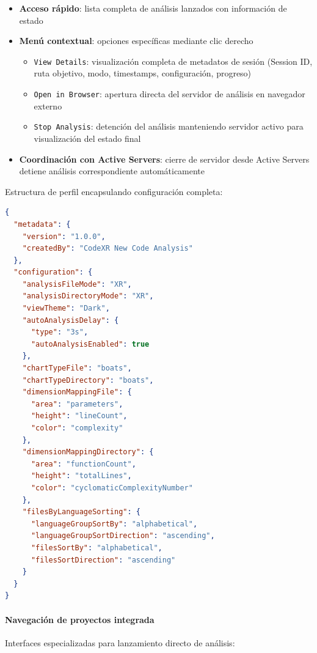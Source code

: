 \documentclass[a4paper, 12pt]{book}
\begin{document}
\begin{itemize}
  \item \textbf{Acceso rápido}: lista completa de análisis lanzados con información de estado
  \item \textbf{Menú contextual}: opciones específicas mediante clic derecho
  \begin{itemize}
    \item \texttt{View Details}: visualización completa de metadatos de sesión (Session ID, ruta objetivo, modo, timestamps, configuración, progreso)
    \item \texttt{Open in Browser}: apertura directa del servidor de análisis en navegador externo
    \item \texttt{Stop Analysis}: detención del análisis manteniendo servidor activo para visualización del estado final
  \end{itemize}
  \item \textbf{Coordinación con Active Servers}: cierre de servidor desde Active Servers detiene análisis correspondiente automáticamente
\end{itemize}

Estructura de perfil encapsulando configuración completa:

\begin{minipage}{0.9\linewidth}
\begin{lstlisting}[language=json,
caption={Estructura de un perfil de análisis en Code-XR mostrando el perfil por defecto con todas las configuraciones del sistema.},
label={lst:profile-structure}]
{
  "metadata": {
    "version": "1.0.0",
    "createdBy": "CodeXR New Code Analysis"
  },
  "configuration": {
    "analysisFileMode": "XR",
    "analysisDirectoryMode": "XR",
    "viewTheme": "Dark",
    "autoAnalysisDelay": {
      "type": "3s",
      "autoAnalysisEnabled": true
    },
    "chartTypeFile": "boats",
    "chartTypeDirectory": "boats",
    "dimensionMappingFile": {
      "area": "parameters",
      "height": "lineCount",
      "color": "complexity"
    },
    "dimensionMappingDirectory": {
      "area": "functionCount",
      "height": "totalLines",
      "color": "cyclomaticComplexityNumber"
    },
    "filesByLanguageSorting": {
      "languageGroupSortBy": "alphabetical",
      "languageGroupSortDirection": "ascending",
      "filesSortBy": "alphabetical",
      "filesSortDirection": "ascending"
    }
  }
}
\end{lstlisting}
\end{minipage}

\paragraph{Navegación de proyectos integrada}
Interfaces especializadas para lanzamiento directo de análisis:
\end{document}
